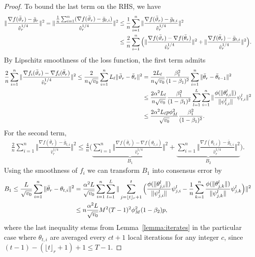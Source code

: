 \documentclass[nohyperref]{article}
\theoremstyle{plain}
\theoremstyle{definition}
\theoremstyle{remark}
\begin{document}
\begin{proof}
To bound the last term on the RHS, we have
\begin{align}\notag
    \Vert \frac{\nabla f(\bar\vartheta_r)-\bar g_r }{\hat v_r^{1/4}}\Vert^2=\Vert \frac{\frac{1}{n}\sum_{i=1}^n (\nabla f(\bar\vartheta_r)-\bar g_{t,i})}{\hat v_r^{1/4}} \Vert^2
    &\leq \frac{1}{n}\sum_{i=1}^n\Vert \frac{\nabla f(\bar\vartheta_r)-\bar g_{t,i}}{\hat v_r^{1/4}} \Vert^2\\\notag
    &\leq \frac{2}{n}\sum_{i=1}^n \Big(\Vert \frac{\nabla f(\bar\vartheta_r)-\nabla f(\bar\theta_r)}{\hat v_r^{1/4}} \Vert^2+\Vert \frac{\nabla f(\bar\theta_r)-\bar g_{t,i}}{\hat v_r^{1/4}} \Vert^2  \Big). 
\end{align}
By Lipschitz smoothness of the loss function, the first term admits
\begin{align}\notag
    \frac{2}{n}\sum_{i=1}^n\Vert \frac{\nabla f_i(\bar\vartheta_r)-\nabla f_i(\bar\theta_r)}{\hat v_r^{1/4}} \Vert^2 \leq \frac{2}{n \sqrt{v_0}}\sum_{i=1}^n L_\ell\Vert \bar\vartheta_r-\bar\theta_r\Vert^2 & =\frac{2L_\ell}{n \sqrt{v_0}}\frac{\beta_1^2}{(1-\beta_1)^2}\sum_{i=1}^n \Vert \bar\theta_r-\bar\theta_{t-1}\Vert ^2\\\notag
    &\leq \frac{2\alpha^2 L_\ell }{n \sqrt{v_0}}\frac{\beta_1^2}{(1-\beta_1)^2} \sum_{l=1}^L \sum_{i=1}^n\Vert \frac{\phi(\Vert \theta_{t,i}^l\Vert)}{\Vert \psi_{t,i}^l\Vert}\psi_{t,i}^l \Vert^2\\\notag
    &\leq \frac{2\alpha^2 L_\ell p\phi_M^2}{ \sqrt{v_0}}\frac{\beta_1^2}{(1-\beta_1)^2}.
\end{align}
For the second term,
\begin{align}\label{eq:inter}
    \frac{2}{n}\sum_{i=1}^n\Vert \frac{\nabla f(\bar\theta_r)-\bar g_{t,i}}{\hat v_r^{1/4}} \Vert^2 \leq \frac{4}{n}\Big( \underbrace{\sum_{i=1}^n \Vert \frac{\nabla f(\bar\theta_r)-\nabla f(\theta_{t,i})}{\hat v_r^{1/4}} \Vert^2}_{B_1} + \underbrace{ \sum_{i=1}^n\Vert \frac{\nabla f(\theta_{t,i})-\bar g_{t,i}}{\hat v_r^{1/4}} \Vert^2}_{B_2} \Big).
\end{align}
Using the smoothness of $f_i$ we can transform $B_1$ into consensus error by
\begin{align}\notag
    B_1\leq \frac{L}{\sqrt{v_0}}\sum_{i=1}^n \Vert \bar\theta_r - \theta_{t,i}\Vert^2  & =\frac{\alpha^2 L}{\sqrt{v_0}}\sum_{i=1}^n\sum_{l=1}^L \| \sum_{j=\lfloor t \rfloor_r+1}^t \Big( \frac{\phi(\Vert \theta_{j,i}^l\Vert)}{\Vert \psi_{j,i}^l\Vert}\psi_{j,i}^l-\frac{1}{n}\sum_{k=1}^n \frac{\phi(\Vert \theta_{j,k}^l\Vert)}{\Vert \psi_{j,k}^l\Vert}\psi_{j,k}^l \Big) \|^2\\\label{eqn:B1}
    &\leq n \frac{\alpha^2 L}{\sqrt{v_0}} M^2 (T-1)^2 \phi_M^2 (1-\beta_2)p,
\end{align}
where the last inequality stems from Lemma~\ref{lemma:iterates} in the particular case where $  \theta_{t,i}$ are averaged every $ct+1$ local iterations for any integer $c$, since $(t-1)-(\lfloor t \rfloor_r+1)+1 \leq T-1$.



\end{proof}
\end{document}
